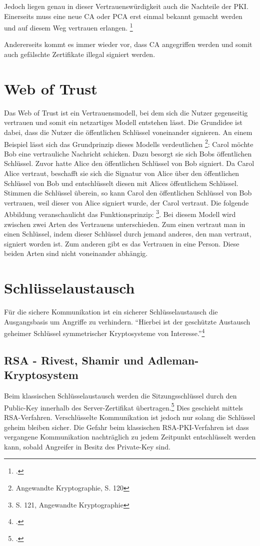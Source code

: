 \documentclass  [paper=a4,
				fontsize=12pt,
				listof=totoc,
				bibliography=totoc
				]{scrreprt}
\begin{document}
			Jedoch liegen genau in dieser Vertrauenswürdigkeit auch die Nachteile der \ac{PKI}. Einerseits muss eine neue \ac{CA} oder \ac{PCA} erst einmal bekannt gemacht werden und auf diesem Weg vertrauen erlangen. \footcite[Vgl.][]{Schwenk, S.24}
			
			Andererseits kommt es immer wieder vor, dass \ac{CA} angegriffen werden und somit auch gefälschte Zertifikate illegal signiert werden.
				
		\section{Web of Trust}
			Das Web of Trust ist ein Vertrauensmodell, bei dem sich die Nutzer gegenseitig vertrauen und somit ein netzartiges Modell entstehen lässt. Die Grundidee ist dabei, dass die Nutzer die öffentlichen Schlüssel voneinander signieren. An einem Beispiel lässt sich das Grundprinzip dieses Modells verdeutlichen \footnote{Angewandte Kryptographie, S. 120}: Carol möchte Bob eine vertrauliche Nachricht schicken. Dazu besorgt sie sich Bobs öffentlichen Schlüssel. Zuvor hatte Alice den öffentlichen Schlüssel von Bob signiert. Da Carol Alice vertraut, beschafft sie sich die Signatur von Alice über den öffentlichen Schlüssel von Bob und entschlüsselt diesen mit Alices öffentlichem Schlüssel. Stimmen die Schlüssel überein, so kann Carol den öffentlichen Schlüssel von Bob vertrauen, weil dieser von Alice signiert wurde, der Carol vertraut. Die folgende Abbildung veranschaulicht das Funktionsprinzip:
			\footnote{S. 121, Angewandte Kryptographie}.
			Bei diesem Modell wird zwischen zwei Arten des Vertrauens unterschieden. Zum einen vertraut man in einen Schlüssel, indem dieser Schlüssel durch jemand anderes, den man vertraut, signiert worden ist. Zum anderen gibt es das Vertrauen in eine Person. Diese beiden Arten sind nicht voneinander abhängig.

		\section{Schlüsselaustausch}
			Für die sichere Kommunikation ist ein sicherer Schlüsselaustausch die Ausgangsbasis um Angriffe zu verhindern. ``Hierbei ist der geschützte Austausch geheimer Schlüssel symmetrischer Kryptosysteme von Interesse.''\footcite[S. 437]{Eckert2013}
			\subsection{RSA - Rivest, Shamir und Adleman-Kryptosystem} 
				Beim klassischen Schlüsselaustausch werden die Sitzungsschlüssel durch den Public-Key innerhalb des Server-Zertifikat übertragen.\footcite[Vgl.][]{Boeck2013} Dies geschieht mittels \ac{RSA}-Verfahren. Verschlüsselte Kommunikation ist jedoch nur solang die Schlüssel geheim bleiben sicher. Die Gefahr beim klassischen \ac{RSA}-\ac{PKI}-Verfahren ist dass vergangene Kommunikation nachträglich zu jedem Zeitpunkt entschlüsselt werden kann, sobald Angreifer in Besitz des Private-Key sind.\medskip\\
\end{document}
